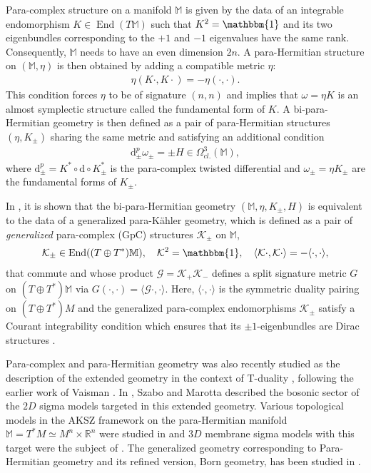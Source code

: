 \documentclass[letterpaper,12pt]{article}
\newcommand{\TT}{{T\oplus T^*}}
\newcommand{\KK}{\mathcal{K}}
\newcommand{\GG}{\mathcal{G}}
\newcommand{\RR}{\mathbb{R}}
\newcommand{\id}{\mathbbm{1}}
\newcommand{\rd}{\mathrm{d}}
\newcommand{\la}{\langle}
\newcommand{\ra}{\rangle}
\newcommand{\Mb}{\mathbb{M}}
\theoremstyle{definition}
\theoremstyle{remark}
\theoremstyle{examples}
\DeclareMathOperator{\End}{End}
\begin{document}
Para-complex structure on a manifold $\Mb$ is given by the data of an integrable endomorphism $K \in \End(T\Mb)$ such that $K^2=\id$ and its two eigenbundles corresponding to the $+1$ and $-1$ eigenvalues have the same rank. Consequently, $\Mb$ needs to have an even dimension $2n$. A para-Hermitian structure on $(\Mb,\eta)$ is then obtained by adding a compatible metric $\eta$:
\begin{align*}
\eta(K\cdot,K\cdot)=-\eta(\cdot,\cdot).
\end{align*}
This condition forces $\eta$ to be of signature $(n,n)$ and implies that $\omega=\eta K$ is an almost symplectic structure called the fundamental form of $K$. A bi-para-Hermitian geometry is then defined as a pair of para-Hermitian structures $(\eta,K_\pm)$ sharing the same metric and satisfying an additional condition
\begin{align}
\rd^p_\pm\omega_\pm=\pm H \in \Omega^3_{cl.}(\Mb),
\end{align}
where $\rd^p_\pm=K^*\circ \rd\circ K_\pm^*$ is the para-complex twisted differential and $\omega_\pm=\eta K_\pm$ are the fundamental forms of $K_\pm$.

In \cite{Hu:2019zro}, it is shown that the bi-para-Hermitian geometry $(\Mb,\eta,K_\pm,H)$ is equivalent to the data of a generalized para-K\"ahler geometry, which is defined as a pair of {\it generalized} para-complex (GpC) structures $\KK_\pm$ \cite{wade2004dirac,Zabzine:2006uz,Hu:2019zro} on $\Mb$,
\begin{align*}
\KK_\pm \in \End((\TT)\Mb), \quad \KK^2=\id, \quad \la \KK\cdot,\KK\cdot\ra=-\la\cdot,\cdot \ra,
\end{align*}
that commute and whose product $\GG=\KK_+\KK_-$ defines a split signature metric $G$ on $(\TT)\Mb$ via $G(\cdot,\cdot)=\la \GG\cdot,\cdot\ra$. Here, $\la\cdot,\cdot \ra$ is the symmetric duality pairing on $(\TT)M$ and the generalized para-complex endomorphisms $\KK_\pm$ satisfy a Courant integrability condition which ensures that its $\pm 1$-eigenbundles are Dirac structures \cite{courant1990dirac}.


Para-complex and para-Hermitian geometry was also recently studied as the description of the extended geometry in the context of T-duality \cite{freidel2017generalised,Freidel:2018tkj,Svoboda:2018rci,Marotta:2018myj}, following the earlier work of Vaisman \cite{vaisman2012geometry,vaisman2013towards}. In \cite{Marotta:2019eqc}, Szabo and Marotta described the bosonic sector of the $2D$ sigma models targeted in this extended geometry. Various topological models in the AKSZ framework on the para-Hermitian manifold $\Mb=T^*M\simeq M^n\times \RR^n$ were studied in \cite{Kokenyesi:2018xgj} and $3D$ membrane sigma models with this target were the subject of \cite{Chatzistavrakidis:2018ztm}. The generalized geometry corresponding to Para-Hermitian geometry and its refined version, Born geometry, has been studied in \cite{Hu:2019zro}.
\end{document}

